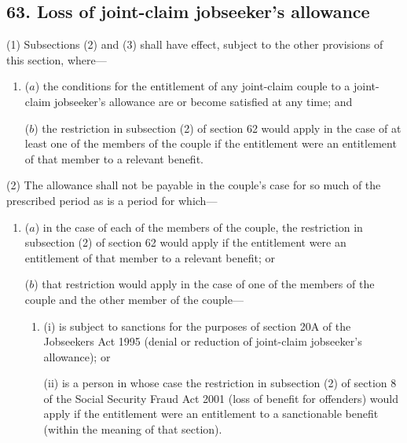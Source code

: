 \documentclass[12pt,a4paper]{article}
\begin{document}

\subsection{63. Loss of joint-claim jobseeker’s allowance}

(1) Subsections (2)  and (3)  shall have effect, subject to the other provisions of this section, where—
\begin{enumerate}\item[]
($a$) the conditions for the entitlement of any joint-claim couple to a joint-claim jobseeker’s allowance are or become satisfied at any time; and

($b$) the restriction in subsection (2)  of section 62 would apply in the case of at least one of the members of the couple if the entitlement were an entitlement of that member to a relevant benefit.
\end{enumerate}

(2) The allowance shall not be payable in the couple’s case for so much of the prescribed period as is a period for which—
\begin{enumerate}\item[]
($a$) in the case of each of the members of the couple, the restriction in subsection (2)  of section 62 would apply if the entitlement were an entitlement of that member to a relevant benefit; or


($b$) that restriction would apply in the case of one of the members of the couple and the other member of the couple—
\begin{enumerate}\item[]
(i) is subject to sanctions for the purposes of section 20A of the Jobseekers Act 1995 (denial or reduction of joint-claim jobseeker’s allowance); or

(ii) is a person in whose case the restriction in subsection (2) of section 8 of the Social Security Fraud Act 2001 (loss of benefit for offenders) would apply if the entitlement were an entitlement to a sanctionable benefit (within the meaning of that section).
\end{enumerate}
\end{enumerate}
\end{document}

